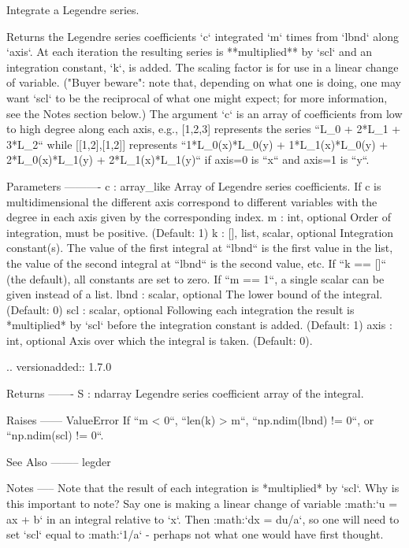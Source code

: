 \begin{DoxyVerb}Integrate a Legendre series.

Returns the Legendre series coefficients `c` integrated `m` times from
`lbnd` along `axis`. At each iteration the resulting series is
**multiplied** by `scl` and an integration constant, `k`, is added.
The scaling factor is for use in a linear change of variable.  ("Buyer
beware": note that, depending on what one is doing, one may want `scl`
to be the reciprocal of what one might expect; for more information,
see the Notes section below.)  The argument `c` is an array of
coefficients from low to high degree along each axis, e.g., [1,2,3]
represents the series ``L_0 + 2*L_1 + 3*L_2`` while [[1,2],[1,2]]
represents ``1*L_0(x)*L_0(y) + 1*L_1(x)*L_0(y) + 2*L_0(x)*L_1(y) +
2*L_1(x)*L_1(y)`` if axis=0 is ``x`` and axis=1 is ``y``.

Parameters
----------
c : array_like
    Array of Legendre series coefficients. If c is multidimensional the
    different axis correspond to different variables with the degree in
    each axis given by the corresponding index.
m : int, optional
    Order of integration, must be positive. (Default: 1)
k : {[], list, scalar}, optional
    Integration constant(s).  The value of the first integral at
    ``lbnd`` is the first value in the list, the value of the second
    integral at ``lbnd`` is the second value, etc.  If ``k == []`` (the
    default), all constants are set to zero.  If ``m == 1``, a single
    scalar can be given instead of a list.
lbnd : scalar, optional
    The lower bound of the integral. (Default: 0)
scl : scalar, optional
    Following each integration the result is *multiplied* by `scl`
    before the integration constant is added. (Default: 1)
axis : int, optional
    Axis over which the integral is taken. (Default: 0).

    .. versionadded:: 1.7.0

Returns
-------
S : ndarray
    Legendre series coefficient array of the integral.

Raises
------
ValueError
    If ``m < 0``, ``len(k) > m``, ``np.ndim(lbnd) != 0``, or
    ``np.ndim(scl) != 0``.

See Also
--------
legder

Notes
-----
Note that the result of each integration is *multiplied* by `scl`.
Why is this important to note?  Say one is making a linear change of
variable :math:`u = ax + b` in an integral relative to `x`.  Then
:math:`dx = du/a`, so one will need to set `scl` equal to
:math:`1/a` - perhaps not what one would have first thought.


\end{DoxyVerb}
